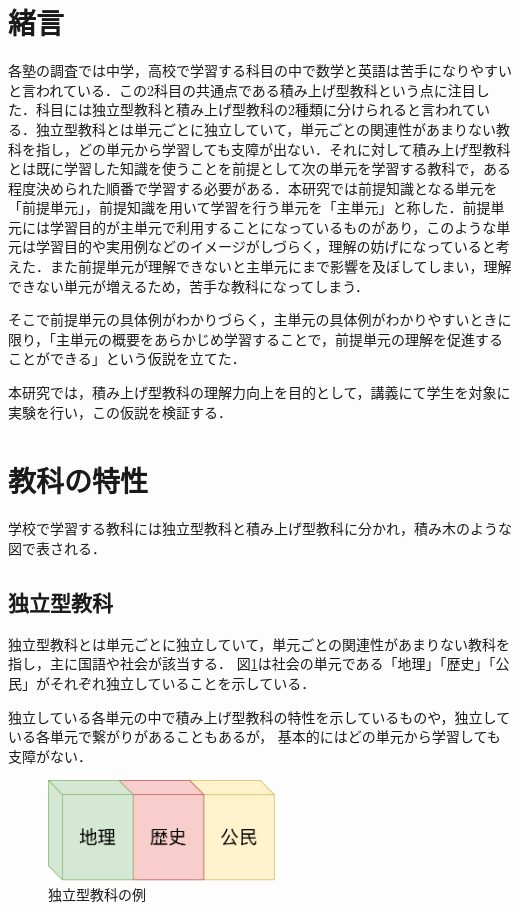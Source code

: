 \documentclass[a4j,12pt]{jsarticle}
\begin{document}
\newpage
\section{緒言}


各塾の調査では中学，高校で学習する科目の中で数学と英語は苦手になりやすいと言われている\cite{1}．この2科目の共通点である積み上げ型教科という点に注目した．科目には独立型教科と積み上げ型教科の2種類に分けられると言われている．独立型教科とは単元ごとに独立していて，単元ごとの関連性があまりない教科を指し，どの単元から学習しても支障が出ない．それに対して積み上げ型教科とは既に学習した知識を使うことを前提として次の単元を学習する教科で，ある程度決められた順番で学習する必要がある．本研究では前提知識となる単元を「前提単元」，前提知識を用いて学習を行う単元を「主単元」と称した．前提単元には学習目的が主単元で利用することになっているものがあり，このような単元は学習目的や実用例などのイメージがしづらく，理解の妨げになっていると考えた．また前提単元が理解できないと主単元にまで影響を及ぼしてしまい，理解できない単元が増えるため，苦手な教科になってしまう．

そこで前提単元の具体例がわかりづらく，主単元の具体例がわかりやすいときに限り，「主単元の概要をあらかじめ学習することで，前提単元の理解を促進することができる」という仮説を立てた．

本研究では，積み上げ型教科の理解力向上を目的として，講義にて学生を対象に実験を行い，この仮説を検証する．

\newpage
\section{教科の特性}
学校で学習する教科には独立型教科と積み上げ型教科に分かれ，積み木のような図で表される．\\


\subsection{独立型教科}
独立型教科とは単元ごとに独立していて，単元ごとの関連性があまりない教科を指し，主に国語や社会が該当する．
図\ref{fig:01}は社会の単元である「地理」「歴史」「公民」がそれぞれ独立していることを示している．

独立している各単元の中で積み上げ型教科の特性を示しているものや，独立している各単元で繋がりがあることもあるが，
基本的にはどの単元から学習しても支障がない．\\
\begin{figure}[H]
\centering
\includegraphics[width=6cm]{01.pdf}
\caption{独立型教科の例}
\label{fig:01}
\end{figure} 
\end{document}
